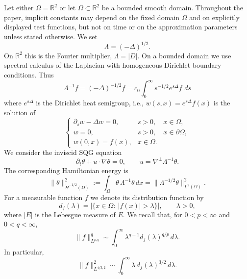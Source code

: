 \documentclass[11pt,reqno]{amsproc}
\newcommand{\R}{\mathbb R}
\newcommand{\Om}{\Omega}
\newcommand{\dd}{\,d}
\newcommand{\Lam}{\Lambda}
\begin{document}
Let either $\Om=\R^2$ or let $\Om\subset\R^2$ be a bounded smooth domain.
Throughout the paper, implicit constants may depend on the fixed domain
$\Om$ and on explicitly displayed test functions, but not on time or on the
approximation parameters unless stated otherwise.  We set
\[
  \Lam=(-\Delta)^{1/2}.
\]
On $\R^2$ this is the Fourier multiplier, $\Lam = |D|$.  On a bounded domain we use 
spectral calculus of the Laplacian with homogeneous Dirichlet boundary conditions.  Thus
\begin{equation}\label{eq:heat-representation}
  \Lam^{-1} f=(-\Delta)^{-1/2}f
  = c_0\int_0^\infty s^{-1/2}e^{s\Delta}f\,\dd s
\end{equation}
where $e^{s\Delta}$ is the Dirichlet heat semigroup, i.e.,
$w(s,x)=e^{s\Delta}f(x)$ is the solution of
\begin{equation}
	\begin{cases}
		\partial_s w-\Delta w=0,
		& s>0,\quad x\in\Om,\\
		w=0,
		& s >0,\quad x\in\partial\Om,\\
		w(0,x)=f(x),
		& x\in\Om.
	\end{cases}
\end{equation}
We consider the inviscid SQG equation
\begin{equation}\label{eq:sqg}
  \partial_t\theta+u\cdot\nabla\theta=0,
  \qquad
  u=\nabla^\perp\Lam^{-1}\theta .
\end{equation}
The corresponding Hamiltonian energy is
\begin{equation}\label{eq:hminus-energy}
  \|\theta\|_{\dot H^{-1/2}(\Om)}^2
  :=\int_\Om \theta\,\Lam^{-1}\theta\dd x
  =\|\Lam^{-1/2}\theta\|_{L^2(\Om)}^2.
\end{equation}
For a measurable function $f$ we denote its distribution function by
\[
  d_f(\lambda)=|\{x\in\Om:\ |f(x)|>\lambda\}|,
  \qquad \lambda>0,
\]
where $|E|$ is the Lebesgue measure of $E$.
We recall that, for $0<p<\infty$ and $0<q<\infty$,
\begin{equation}\label{eq:lorentz-distribution}
  \|f\|_{L^{p,q}}^q
  \sim
  \int_0^\infty \lambda^{q-1}d_f(\lambda)^{q/p}\dd\lambda .
\end{equation}
In particular,
\begin{equation}\label{eq:l432-distribution}
  \|f\|_{L^{4/3,2}}^2
  \sim
  \int_0^\infty \lambda\,d_f(\lambda)^{3/2}\dd\lambda .
\end{equation}
\end{document}
